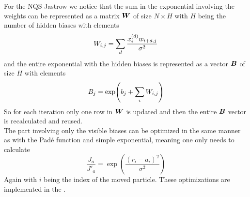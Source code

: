     For the NQS-Jastrow we notice that the sum in the exponential involving the
    weights can be represented as a matrix $\boldsymbol{{W}}$ of size $N\times H$ with
    $H$ being the number of hidden biases with elements
        \begin{equation}
            W_{i,j} = \sum\limits_{d}\frac{x^{(d)}_iw_{i+d,j}}{\sigma^2}
        \end{equation}
    and the entire exponential with the hidden biases is represented as a
    vector $\boldsymbol{{B}}$ of size $H$ with elements
        \begin{equation}
            B_j = \exp(b_j + \sum\limits_{i} W_{i,j})
        \end{equation}
    So for each iteration only one row in $\boldsymbol{{W}}$ is updated and then the
    entire $\boldsymbol{{B}}$ vector is recalculated and reused. \\ The part involving
    only the visible biases can be optimized in the same manner as with the
    Pad\'e function and simple exponential, meaning one only needs to
    calculate
        \begin{equation}
            \frac{J_a}{J'_a} = \exp(\frac{\left(r_i -
            a_i\right)^2}{\sigma^2})
        \end{equation}
    Again with $i$ being the index of the moved particle. These optimizations
    are implemented in the .

